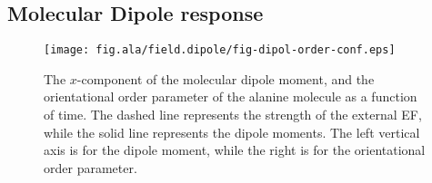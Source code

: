 \documentclass[a4paper,preprint,unsortedaddress,onecolumn]{revtex4-1}
\begin{document}


\subsection{Molecular Dipole response}

\begin{figure}
  \centering
  \texttt{[image: fig.ala/field.dipole/fig-dipol-order-conf.eps]}
  \caption{The
    $x$-component of the molecular dipole moment, and the orientational order parameter
    of the alanine molecule as a
    function of time. The dashed line represents the strength of the
    external EF, while the solid line represents the dipole
    moments. The left vertical axis is for the dipole moment, while
    the right is for the orientational order parameter.
  }
  \label{fig:tmp3}
\end{figure}
\end{document}
